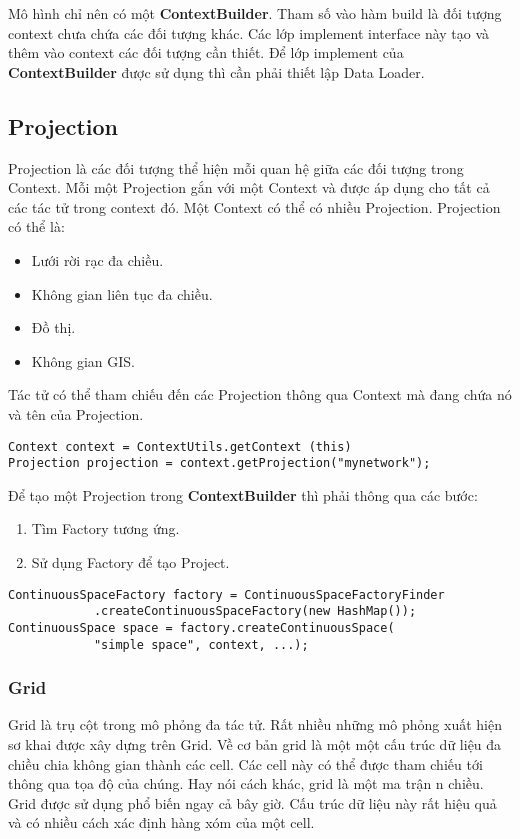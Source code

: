 \documentclass[../report.tex]{subfiles}
\begin{document}
Mô hình chỉ nên có một \textbf{ContextBuilder}. Tham số vào hàm build là đối tượng context chưa chứa các đối tượng khác. 
Các lớp implement interface này tạo và thêm vào context các đối tượng cần thiết. 
Để lớp implement của \textbf{ContextBuilder} được sử dụng thì cần phải thiết lập Data Loader. 

\subsection{Projection}
Projection là các đối tượng thể hiện mỗi quan hệ giữa các đối tượng trong Context. 
Mỗi một Projection gắn với một Context và được áp dụng cho tất cả các tác tử trong context đó.  
Một Context có thể có nhiều Projection.
Projection có thể là: 
\begin{itemize}
    \item Lưới rời rạc đa chiều. 
    \item Không gian liên tục đa chiều. 
    \item Đồ thị. 
    \item Không gian GIS. 
\end{itemize}

Tác tử có thể tham chiếu đến các Projection thông qua Context mà đang chứa nó và tên của Projection.  \\
\HRule
\begin{lstlisting}
Context context = ContextUtils.getContext (this)
Projection projection = context.getProjection("mynetwork");
\end{lstlisting}
\HRule

Để tạo một Projection trong \textbf{ContextBuilder} thì phải thông qua các bước: 
\begin{enumerate}
    \item Tìm Factory tương ứng. 
    \item Sử dụng Factory để tạo Project. 
\end{enumerate}
\HRule
\begin{lstlisting}
ContinuousSpaceFactory factory = ContinuousSpaceFactoryFinder
            .createContinuousSpaceFactory(new HashMap());
ContinuousSpace space = factory.createContinuousSpace(
            "simple space", context, ...);
\end{lstlisting}
\HRule

\subsubsection{Grid}
Grid là trụ cột trong mô phỏng đa tác tử. Rất nhiều những mô phỏng xuất hiện sơ khai được xây dựng trên Grid. 
Về cơ bản grid là một một cấu trúc dữ liệu đa chiều chia không gian thành các cell. Các cell này có thể 
được tham chiếu tới thông qua tọa độ của chúng. Hay nói cách khác, grid là một ma trận n chiều. 
Grid được sử dụng phổ biến ngay cả bây giờ. Cấu trúc dữ liệu này rất hiệu quả và có nhiều cách xác định 
hàng xóm của một cell. 
\end{document}
